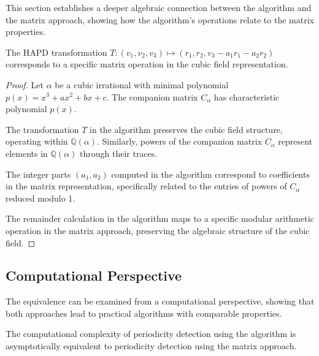 This section establishes a deeper algebraic connection between the \HAPD{} algorithm and the matrix approach, showing how the algorithm's operations relate to the matrix properties.

\begin{proposition}
The HAPD transformation $T: (v_1, v_2, v_3) \mapsto (r_1, r_2, v_3 - a_1r_1 - a_2r_2)$ corresponds to a specific matrix operation in the cubic field representation.
\end{proposition}

\begin{proof}
Let $\alpha$ be a cubic irrational with minimal polynomial $p(x) = x^3 + ax^2 + bx + c$. The companion matrix $C_\alpha$ has characteristic polynomial $p(x)$.

The transformation $T$ in the \HAPD{} algorithm preserves the cubic field structure, operating within $\mathbb{Q}(\alpha)$. Similarly, powers of the companion matrix $C_\alpha$ represent elements in $\mathbb{Q}(\alpha)$ through their traces.

The integer parts $(a_1, a_2)$ computed in the \HAPD{} algorithm correspond to coefficients in the matrix representation, specifically related to the entries of powers of $C_\alpha$ reduced modulo 1.

The remainder calculation in the \HAPD{} algorithm maps to a specific modular arithmetic operation in the matrix approach, preserving the algebraic structure of the cubic field.
\end{proof}

\subsection{Computational Perspective}

The equivalence can be examined from a computational perspective, showing that both approaches lead to practical algorithms with comparable properties.

\begin{theorem}
The computational complexity of periodicity detection using the \HAPD{} algorithm is asymptotically equivalent to periodicity detection using the matrix approach.
\end{theorem}

